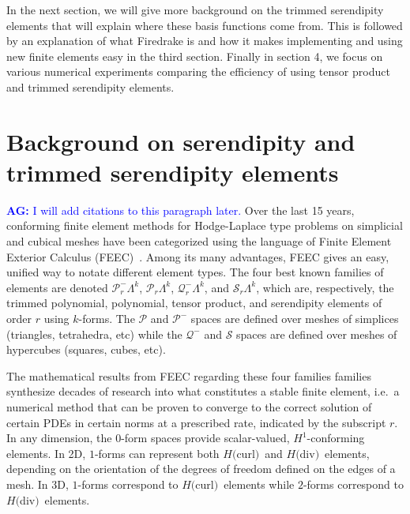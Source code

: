 \documentclass[manuscript,screen]{acmart}
\newcommand{\akg}[1]{{\textcolor{blue}{\textbf{AG:} #1}}}
\newcommand{\calP}{\mathcal{P}}
\newcommand{\calQ}{\mathcal{Q}}
\newcommand{\calS}{\mathcal{S}}
\newcommand{\hcurl}{$H($curl$)$}
\newcommand{\hdiv}{$H($div$)$}
\begin{document}
  In the next section, we will give more background on the trimmed serendipity elements that will explain where these basis functions come from.  This is followed by an explanation of what Firedrake is and how it makes implementing and using new finite elements easy in the third section.  Finally in section 4, we focus on various numerical experiments comparing the efficiency of using tensor product and trimmed serendipity elements.  
  
  \section{Background on serendipity and trimmed serendipity elements}
  
    \akg{I will add citations to this paragraph later.} 
    Over the last 15 years, conforming finite element methods for Hodge-Laplace type problems on simplicial and cubical meshes have been categorized using the language of Finite Element Exterior Calculus (FEEC)~\cite{AFW2006,AFW2010,ABB2012}.  Among its many advantages, FEEC gives an easy, unified way to notate different element types.  The four best known families of elements are denoted $\calP^-_r \Lambda^k$, $\calP_r \Lambda^k$, $\calQ^-_r \Lambda^k$, and $\calS_r \Lambda^k$, which are, respectively, the trimmed polynomial, polynomial, tensor product, and serendipity elements of order $r$ using $k$-forms.  The $\calP$ and $\calP^-$ spaces are defined over meshes of simplices (triangles, tetrahedra, etc) while the $\calQ^-$ and $\calS$ spaces are defined over meshes of hypercubes (squares, cubes, etc).  
    
    The mathematical results from FEEC regarding these four families families synthesize decades of research into what constitutes a stable finite element, i.e.\ a numerical method that can be proven to converge to the correct solution of certain PDEs in certain norms at a prescribed rate, indicated by the subscript $r$.  In any dimension, the $0$-form spaces provide scalar-valued, $H^1$-conforming elements.  In 2D, $1$-forms can represent both \hcurl~and \hdiv~elements, depending on the orientation of the degrees of freedom defined on the edges of a mesh.  In 3D, $1$-forms correspond to \hcurl~elements while $2$-forms correspond to \hdiv~elements.  
        
    
\end{document}
